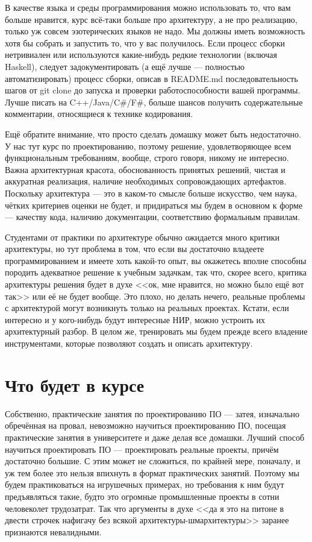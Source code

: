 \documentclass[a5paper]{article}
\begin{document}
В качестве языка и среды программирования можно использовать то, что вам больше нравится, курс всё-таки больше про архитектуру, а не про реализацию, только уж совсем эзотерических языков не надо. Мы должны иметь возможность хотя бы собрать и запустить то, что у вас получилось. Если процесс сборки нетривиален или используются какие-нибудь редкие технологии (включая Haskell), следует задокументировать (а ещё лучше --- полностью автоматизировать) процесс сборки, описав в README.md последовательность шагов от git clone до запуска и проверки работоспособности вашей программы. Лучше писать на C++/Java/C\#/F\#, больше шансов получить содержательные комментарии, относящиеся к технике кодирования.

Ещё обратите внимание, что просто сделать домашку может быть недостаточно. У нас тут курс по проектированию, поэтому решение, удовлетворяющее всем функциональным требованиям, вообще, строго говоря, никому не интересно. Важна архитектурная красота, обоснованность принятых решений, чистая и аккуратная реализация, наличие необходимых сопровождающих артефактов. Поскольку архитектура --- это в каком-то смысле больше искусство, чем наука, чётких критериев оценки не будет, и придираться мы будем в основном к форме --- качеству кода, наличию документации, соответствию формальным правилам.

Студентами от практики по архитектуре обычно ожидается много критики архитектуры, но тут проблема в том, что если вы достаточно владеете программированием и имеете хоть какой-то опыт, вы окажетесь вполне способны породить адекватное решение к учебным задачкам, так что, скорее всего, критика архитектуры решения будет в духе <<ок, мне нравится, но можно было ещё вот так>> или её не будет вообще. Это плохо, но делать нечего, реальные проблемы с архитектурой могут возникнуть только на реальных проектах. Кстати, если интересно и у кого-нибудь будут интересные НИР, можно устроить их архитектурный разбор. В целом же, тренировать мы будем прежде всего владение инструментами, которые позволяют создать и описать архитектуру.

\section{Что будет в курсе}

Собственно, практические занятия по проектированию ПО --- затея, изначально обречённая на провал, невозможно научиться проектированию ПО, посещая практические занятия в университете и даже делая все домашки. Лучший способ научиться проектировать ПО --- проектировать реальные проекты, причём достаточно большие. С этим может не сложиться, по крайней мере, поначалу, и уж тем более это нельзя впихнуть в формат практических занятий. Поэтому мы будем практиковаться на игрушечных примерах, но требования к ним будут предъявляться такие, будто это огромные промышленные проекты в сотни человеколет трудозатрат. Так что аргументы в духе <<да я это на питоне в двести строчек нафигачу без всякой архитектуры-шмархитектуры>> заранее признаются невалидными. 
\end{document}
